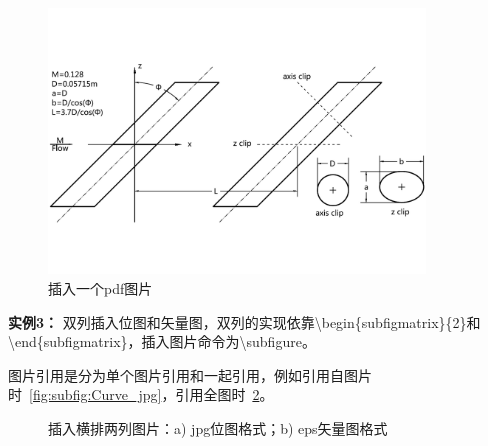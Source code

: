 \begin{figure}
\centering
   \includegraphics[width=10cm]{./img/Geom_pdf}
  \caption{插入一个pdf图片}
  \label{fig:visual}
\end{figure}

{\bf{实例3：}} 双列插入位图和矢量图，双列的实现依靠\textbackslash begin\{subfigmatrix\}\{2\}和\textbackslash end\{subfigmatrix\}，插入图片命令为\textbackslash subfigure。

图片引用是分为单个图片引用和一起引用，例如引用自图片时~\ref{fig:subfig:Curve_jpg}，引用全图时~\ref{fig:twoColns}。

\begin{figure}
\centering
 \begin{subfigmatrix}{2}                 %
 \end{subfigmatrix}
 \caption{插入横排两列图片：a) jpg位图格式；b) eps矢量图格式}
 \label{fig:twoColns}
\end{figure}

